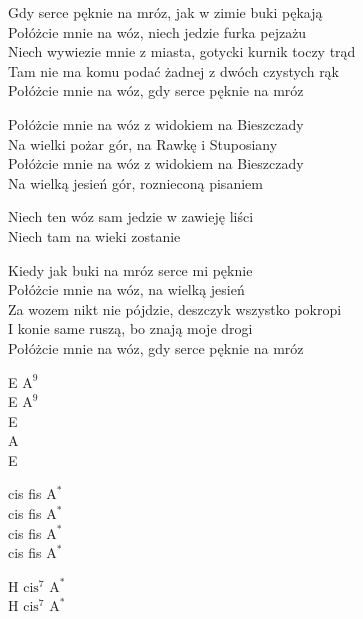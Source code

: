 \begin{text}
    \begin{smallTwo}
    Gdy serce pęknie na mróz, jak w zimie buki pękają\\
    Połóżcie mnie na wóz, niech jedzie furka pejzażu\\
    Niech wywiezie mnie z miasta, gotycki kurnik toczy trąd\\
    Tam nie ma komu podać żadnej z dwóch czystych rąk\\
    Połóżcie mnie na wóz, gdy serce pęknie na mróz

    \vin Połóżcie mnie na wóz z widokiem na Bieszczady\\
    \vin Na wielki pożar gór, na Rawkę i Stuposiany\\
    \vin Połóżcie mnie na wóz z widokiem na Bieszczady\\
    \vin Na wielką jesień gór, roznieconą pisaniem

    \vin Niech ten wóz sam jedzie w zawieję liści\\
    \vin Niech tam na wieki zostanie

    Kiedy jak buki na mróz serce mi pęknie\\
    Połóżcie mnie na wóz, na wielką jesień\\
    Za wozem nikt nie pójdzie, deszczyk wszystko pokropi\\
    I konie same ruszą, bo znają moje drogi\\
    Połóżcie mnie na wóz, gdy serce pęknie na mróz
    \end{smallTwo}
\end{text}
\begin{chord}
    \begin{smallTwo}
    E $\mathrm{A^9}$\\
    E $\mathrm{A^9}$\\
    E\\
    A\\
    E

    cis fis $\mathrm{A^*}$\\
    cis fis $\mathrm{A^*}$\\
    cis fis $\mathrm{A^*}$\\
    cis fis $\mathrm{A^*}$

    H $\mathrm{cis^7}$ $\mathrm{A^*}$\\
    H $\mathrm{cis^7}$ $\mathrm{A^*}$
    \end{smallTwo}
\end{chord}
